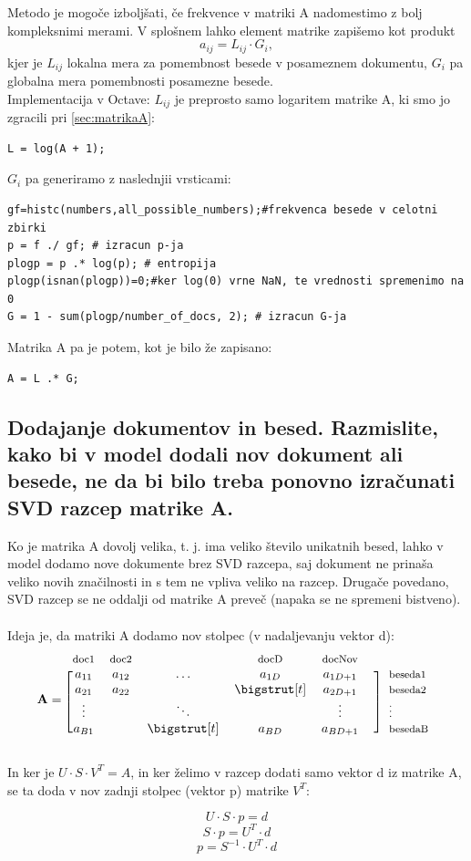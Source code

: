\documentclass{article}
\begin{document}
Metodo je mogoče izboljšati, če frekvence v matriki A nadomestimo z bolj kompleksnimi merami. V splošnem lahko element matrike zapišemo kot produkt
\[ a_{ij} = L_{ij} \cdot G_{i}, \]
 kjer je \(L_{ij} \) lokalna mera za pomembnost besede v posameznem dokumentu, \(G_{i} \) pa globalna mera pomembnosti posamezne besede. \\

Implementacija v Octave:
 \(L_{ij} \) je preprosto samo logaritem matrike A, ki smo jo zgracili pri \ref{sec:matrikaA}:
\begin{lstlisting}
L = log(A + 1);
\end{lstlisting}
\(G_{i} \)  pa generiramo z naslednjii vrsticami:
\begin{lstlisting}
gf=histc(numbers,all_possible_numbers);#frekvenca besede v celotni zbirki
p = f ./ gf; # izracun p-ja
plogp = p .* log(p); # entropija
plogp(isnan(plogp))=0;#ker log(0) vrne NaN, te vrednosti spremenimo na 0
G = 1 - sum(plogp/number_of_docs, 2); # izracun G-ja
\end{lstlisting}
Matrika A pa je potem, kot je bilo že zapisano:
\begin{lstlisting}
A = L .* G;
\end{lstlisting}

\subsection{Dodajanje dokumentov in besed. Razmislite, kako bi v model dodali nov dokument ali besede, ne da bi bilo treba ponovno izračunati SVD razcep matrike A.}

Ko je matrika A dovolj velika, t. j. ima veliko število unikatnih besed, lahko v model dodamo nove dokumente brez SVD razcepa, saj dokument ne prinaša veliko novih značilnosti in s tem ne vpliva veliko na razcep. Drugače povedano, SVD razcep se ne oddalji od matrike A preveč (napaka se ne spremeni bistveno). \\ \\
Ideja je, da matriki A dodamo nov stolpec (v nadaljevanju vektor d):
\begin{equation*}
  \mathbf{A}=
  \begin{blockarray}{*{6}{c} l}
    \begin{block}{*{6}{>{$\footnotesize}c<{$}} l}
      doc1 & doc2 &  &  docD & docNov \\
    \end{block}
    \begin{block}{[*{6}{c}]>{$\footnotesize}l<{$}}
      a_{11}  & a_{12} & \dots           & a_{1D}       & a_{1D+1}  &  & beseda1 \\
       a_{21} & a_{22} &                    & \bigstrut[t] &  a_{2D+1} &  &  beseda2 \\
      \vdots   &             & \ddots         &                    &  \vdots       &  &   \vdots  \\
      a_{B1} &              &  \bigstrut[t] & a_{BD}       &  a_{BD+1} &  &  besedaB \\
    \end{block}
  \end{blockarray}
\end{equation*}

In ker je \( U \cdot S \cdot V^{T} = A \), in ker želimo v razcep dodati samo vektor d iz matrike A, se ta doda v nov zadnji stolpec (vektor p) matrike \(  V^{T} \):

\[ 
U \cdot S \cdot p = d \]
\[ S \cdot p = U^{T} \cdot d   \]
\[ p = S^{-1} \cdot  U^{T} \cdot d  \]
\end{document}
